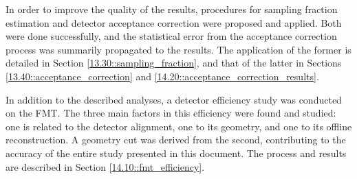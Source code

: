     In order to improve the quality of the results, procedures for sampling fraction estimation and detector acceptance correction were proposed and applied.
    Both were done successfully, and the statistical error from the acceptance correction process was summarily propagated to the results.
    The application of the former is detailed in Section \ref{13.30::sampling_fraction}, and that of the latter in Sections \ref{13.40::acceptance_correction} and \ref{14.20::acceptance_correction_results}.

    In addition to the described analyses, a detector efficiency study was conducted on the FMT.
    The three main factors in this efficiency were found and studied: one is related to the detector alignment, one to its geometry, and one to its offline reconstruction.
    A geometry cut was derived from the second, contributing to the accuracy of the entire study presented in this document.
    The process and results are described in Section \ref{14.10::fmt_efficiency}.
